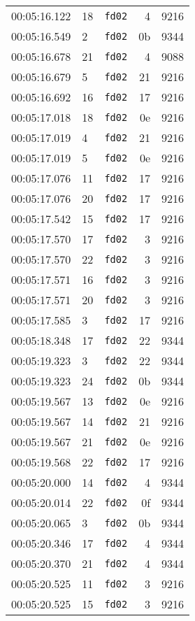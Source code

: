 \documentclass{article}
\begin{document}
\begin{longtable}{lllrr}
00:05:16.122 & 18 & \texttt{fd02} & 4 & 9216 \\
00:05:16.549 & 2 & \texttt{fd02} & 0b & 9344 \\
00:05:16.678 & 21 & \texttt{fd02} & 4 & 9088 \\
00:05:16.679 & 5 & \texttt{fd02} & 21 & 9216 \\
00:05:16.692 & 16 & \texttt{fd02} & 17 & 9216 \\
00:05:17.018 & 18 & \texttt{fd02} & 0e & 9216 \\
00:05:17.019 & 4 & \texttt{fd02} & 21 & 9216 \\
00:05:17.019 & 5 & \texttt{fd02} & 0e & 9216 \\
00:05:17.076 & 11 & \texttt{fd02} & 17 & 9216 \\
00:05:17.076 & 20 & \texttt{fd02} & 17 & 9216 \\
00:05:17.542 & 15 & \texttt{fd02} & 17 & 9216 \\
00:05:17.570 & 17 & \texttt{fd02} & 3 & 9216 \\
00:05:17.570 & 22 & \texttt{fd02} & 3 & 9216 \\
00:05:17.571 & 16 & \texttt{fd02} & 3 & 9216 \\
00:05:17.571 & 20 & \texttt{fd02} & 3 & 9216 \\
00:05:17.585 & 3 & \texttt{fd02} & 17 & 9216 \\
00:05:18.348 & 17 & \texttt{fd02} & 22 & 9344 \\
00:05:19.323 & 3 & \texttt{fd02} & 22 & 9344 \\
00:05:19.323 & 24 & \texttt{fd02} & 0b & 9344 \\
00:05:19.567 & 13 & \texttt{fd02} & 0e & 9216 \\
00:05:19.567 & 14 & \texttt{fd02} & 21 & 9216 \\
00:05:19.567 & 21 & \texttt{fd02} & 0e & 9216 \\
00:05:19.568 & 22 & \texttt{fd02} & 17 & 9216 \\
00:05:20.000 & 14 & \texttt{fd02} & 4 & 9344 \\
00:05:20.014 & 22 & \texttt{fd02} & 0f & 9344 \\
00:05:20.065 & 3 & \texttt{fd02} & 0b & 9344 \\
00:05:20.346 & 17 & \texttt{fd02} & 4 & 9344 \\
00:05:20.370 & 21 & \texttt{fd02} & 4 & 9344 \\
00:05:20.525 & 11 & \texttt{fd02} & 3 & 9216 \\
00:05:20.525 & 15 & \texttt{fd02} & 3 & 9216 \\

\end{longtable}
\end{document}
